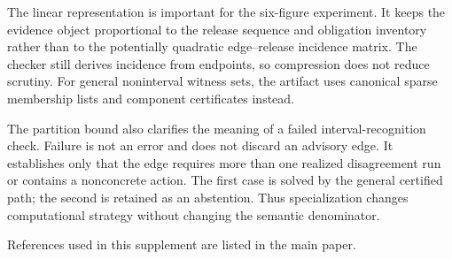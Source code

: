 \documentclass[10pt,conference]{IEEEtran}
\begin{document}
The linear representation is important for the six-figure experiment. It keeps the evidence object proportional to the release sequence and obligation inventory rather than to the potentially quadratic edge--release incidence matrix. The checker still derives incidence from endpoints, so compression does not reduce scrutiny. For general noninterval witness sets, the artifact uses canonical sparse membership lists and component certificates instead.

The partition bound also clarifies the meaning of a failed interval-recognition check. Failure is not an error and does not discard an advisory edge. It establishes only that the edge requires more than one realized disagreement run or contains a nonconcrete action. The first case is solved by the general certified path; the second is retained as an abstention. Thus specialization changes computational strategy without changing the semantic denominator.

\noindent References used in this supplement are listed in the main paper.
\end{document}
